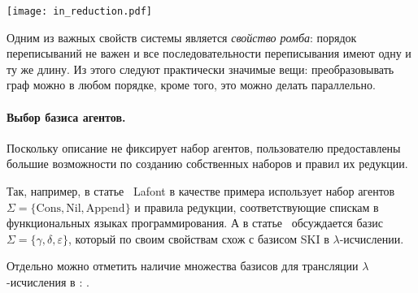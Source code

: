 \begin{center}



    \texttt{[image: in\_reduction.pdf]}
\end{center}

Одним из важных свойств системы является \textit{свойство ромба}: порядок переписываний не важен и все последовательности переписывания имеют одну и ту же длину.
Из этого следуют практически значимые вещи: преобразовывать граф можно в любом порядке, кроме того, это можно делать параллельно.

\paragraph{Выбор базиса агентов.}

Поскольку описание \INs{} не фиксирует набор агентов, пользователю предоставлены большие возможности по созданию собственных наборов и правил их редукции.

Так, например, в статье~\cite{lafontInteractionNets1989} Lafont в качестве примера использует набор агентов $\Sigma = \{\text{Cons}, \text{Nil}, \text{Append}\}$ и правила редукции, соответствующие спискам в функциональных языках программирования.
А в статье~\cite{lafontInteractionCombinators1997} обсуждается базис $\Sigma = \{\gamma, \delta, \varepsilon\}$, который по своим свойствам схож с базисом SKI в $\lambda$-исчислении.

Отдельно можно отметить наличие множества базисов для трансляции $\lambda$-исчисления в \INs{}: \cite{lampingAlgorithmOptimalLambda1990,aspertiBolognaOptimalHigherorder1996,gonthierGeometryOptimalLambda1992,mackieInteractionNetImplementation2011,vincentvanoostromLambdascopeAnotherOptimal2004,sinotCallbyNameCallbyValueTokenPassing2005}.

